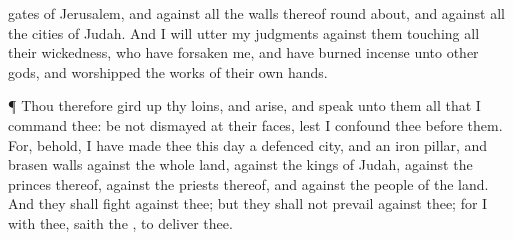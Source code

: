 {gates of
Jerusalem, and against all the
walls thereof round
about, and against all the
cities of
Judah.
And I will
utter my
judgments against them
touching all their
wickedness, who have
forsaken me, and have burned
incense unto
other
gods, and
worshipped the
works of their own
hands.
\par }{\PP {}¶ Thou therefore gird
up thy
loins, and
arise, and
speak unto them all that I
command thee: be not
dismayed at their
faces, lest I
confound thee
before them.
For, behold,
I have
made thee this
day a
defenced
city, and an
iron
pillar, and
brasen
walls against the whole
land, against the
kings of
Judah, against the
princes thereof, against the
priests thereof, and against the
people of the
land.
And they shall
fight against thee; but they shall not
prevail against thee; for I
{} with thee,
saith the
{}, to
deliver thee.

}
